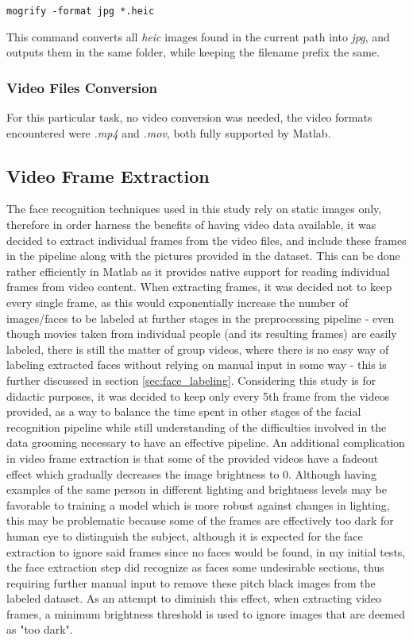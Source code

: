 \documentclass[11pt]{article}
\begin{document}
        \texttt{mogrify  -format jpg   *.heic}

        This command converts all \textit{heic} images found in the current path into \textit{jpg}, and outputs them in the same folder, while keeping the filename prefix the same.

    \subsubsection{Video Files Conversion}
        For this particular task, no video conversion was needed, the video formats encountered were \textit{.mp4} and \textit{.mov}, both fully supported by Matlab.

    \subsection{Video Frame Extraction}
        The face recognition techniques used in this study rely on static images only, therefore in order harness the benefits of having video data available, it was decided to extract individual frames from the video files, and include these frames in the pipeline along with the pictures provided in the dataset. This can be done rather efficiently in Matlab as it provides native support for reading individual frames from video content. When extracting frames, it was decided not to keep every single frame, as this would exponentially increase the number of images/faces to be labeled at further stages in the preprocessing pipeline - even though movies taken from individual people (and its resulting frames) are easily labeled, there is still the matter of group videos, where there is no easy way of labeling extracted faces without relying on manual input in some way - this is further discussed in section \ref{sec:face_labeling}. Considering this study is for didactic purposes, it was decided to keep only every 5th frame from the videos provided, as a way to balance the time spent in other stages of the facial recognition pipeline while still understanding of the difficulties involved in the data grooming necessary to have an effective pipeline. An additional complication in video frame extraction is that some of the provided videos have a fadeout effect which gradually decreases the image brightness to 0. Although having examples of the same person in different lighting and brightness levels may be favorable to training a model which is more robust against changes in lighting, this may be problematic because some of the frames are effectively too dark for human eye to distinguish the subject, although it is expected for the face extraction to ignore said frames since no faces would be found, in my initial tests, the face extraction step did recognize as faces some undesirable sections, thus requiring further manual input to remove these pitch black images from the labeled dataset. As an attempt to diminish this effect, when extracting video frames, a minimum brightness threshold is used to ignore images that are deemed as "too dark".
\end{document}
